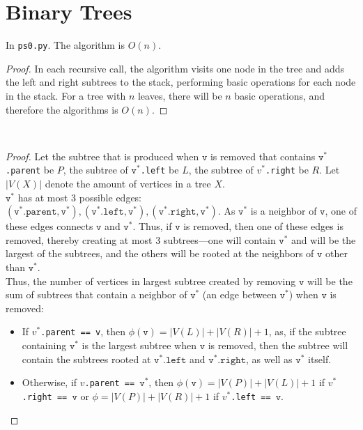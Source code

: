 \documentclass[11pt]{scrartcl}
\theoremstyle{dotlessP}
\theoremstyle{dotlessN}
\begin{document}
\section{Binary Trees}
\begin{ans}
	In \texttt{ps0.py}. The algorithm is $O(n)$.
	\begin{proof}
		In each recursive call, the algorithm visits one node in the tree and adds the left and right subtrees to the stack, performing basic operations for each node in the stack. For a tree with $n$ leaves, there will be $n$ basic operations, and therefore the algorithms is  $O(n)$.
	\end{proof}
\end{ans}
\begin{ans}
	 \
	\begin{proof}
		Let the subtree that is produced when $\texttt{v}$ is removed that contains \texttt{$\texttt{v}^*$.parent} be $P$, the subtree of \texttt{$\texttt{v}^*$.left} be $L$, the subtree of \texttt{$v^*$.right} be $R$. Let $|V(X)|$ denote the amount of vertices in a tree  $X$.
		\\

		$\texttt{v}^*$ has at most 3 possible edges: $(\texttt{v}^*.\texttt{parent}, \texttt{v}^*), (\texttt{v}^*.\texttt{left}, \texttt{v}^*), (\texttt{v}^*.\texttt{right},\texttt{v}^*)$. As $\texttt{v}^*$ is a neighbor of $\texttt{v}$, one of these edges connects $\texttt{v}$ and $\texttt{v}^*$. Thus, if $\texttt{v}$ is removed, then one of these edges is removed, thereby creating at most 3 subtrees---one will contain $\texttt{v}^*$ and will be the largest of the subtrees, and the others will be rooted at the neighbors of $\texttt{v}$ other than $\texttt{v}^*$. 
\\

Thus, the number of vertices in largest subtree created by removing $\texttt{v}$ will be the sum of subtrees that contain a neighbor of $\texttt{v}^*$ (an edge between $\texttt{v}^*$) when $\texttt{v}$ is removed:
		\begin{itemize}
			\item If \texttt{$v^*$.parent == v}, then $\phi(\texttt{v}) = |V(L)| + |V(R)| + 1$, as, if the subtree containing  $\texttt{v}^*$ is the largest subtree when $\texttt{v}$ is removed, then the subtree will contain the subtrees rooted at $\texttt{v}^*.\texttt{left}$ and $\texttt{v}^*.\texttt{right}$, as well as $\texttt{v}^*$ itself. 
			\item Otherwise, if \texttt{$v$.parent == $\texttt{v}^*$}, then $\phi(\texttt{v}) = |V(P)| + |V(L)| + 1$ if \texttt{$v^*$.right ==  $\texttt{v}$} or $\phi = |V(P)| + |V(R)| + 1$ if \texttt{$v^*$.left == $\texttt{v}$}.
		\end{itemize}


\end{proof}
\end{ans}
\end{document}
